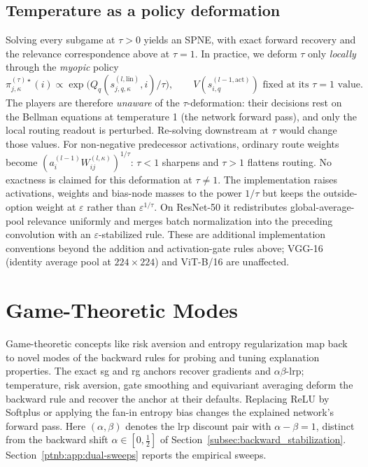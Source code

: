 \subsection{Temperature as a policy deformation}\label{ptnb:app:routing-temp}

Solving every subgame at $\tau>0$ yields an SPNE, with exact forward recovery and the relevance correspondence above at $\tau=1$. In practice, we deform $\tau$ only \emph{locally} through the \emph{myopic} policy
\begin{equation}\label{ptnb:eq:routing-gibbs-general-tau}
 \pi_{j,\kappa}^{(\tau)\star}(i)\propto
 \exp\!\bigl(Q_q(s_{j,q,\kappa}^{(l,\mathrm{lin})},i)/\tau\bigr),
 \qquad V(s_{i,q}^{(l-1,\mathrm{act})})\text{ fixed at its }\tau=1\text{ value}.
\end{equation}
The players are therefore \emph{unaware} of the $\tau$-deformation: their decisions rest on the Bellman equations at temperature 1 (the network forward pass), and only the local routing readout is perturbed. Re-solving downstream at $\tau$ would change those values. For non-negative predecessor activations, ordinary route weights become $(a_i^{(l-1)}W_{ij}^{(l,\kappa)})^{1/\tau}$: $\tau<1$ sharpens and $\tau>1$ flattens routing. No exactness is claimed for this deformation at $\tau\neq1$.
The implementation raises activations, weights and bias-node masses to the power $1/\tau$ but keeps the outside-option weight at $\varepsilon$ rather than $\varepsilon^{1/\tau}$. On ResNet-50 it redistributes global-average-pool relevance uniformly and merges batch normalization into the preceding convolution with an $\varepsilon$-stabilized rule. These are additional implementation conventions beyond the addition and activation-gate rules above; VGG-16 (identity average pool at $224\times224$) and ViT-B/16 are unaffected.

\section{Game-Theoretic Modes}\label{ptnb:sec:modes}\label{sec:risk_aversion_regularization}\label{ptnb:sec:controls}\label{ptnb:app:modes}

Game-theoretic concepts like risk aversion and entropy regularization map back to novel modes of the backward rules for probing and tuning explanation properties. The exact \ac{sg} and \ac{rg} anchors recover gradients and $\alpha\beta$-\ac{lrp}; temperature, risk aversion, gate smoothing and equivariant averaging deform the backward rule and recover the anchor at their defaults. Replacing ReLU by Softplus or applying the fan-in entropy bias changes the explained network's forward pass. Here $(\alpha,\beta)$ denotes the \ac{lrp} discount pair with $\alpha-\beta=1$, distinct from the backward shift $\alpha\in[0,\tfrac12]$ of Section~\ref{subsec:backward_stabilization}. Section~\ref{ptnb:app:dual-sweeps} reports the empirical sweeps.

